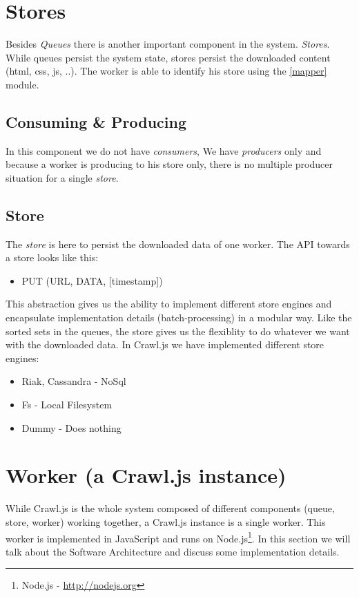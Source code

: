 \section{Stores}
Besides \emph{Queues} there is another important component in the system. \emph{Stores}. While queues persist the system state, stores persist the downloaded content (html, css, js, ..). The worker is able to identify his store using the \ref{mapper} module.
\subsection{Consuming \& Producing}
In this component we do not have \emph{consumers}, We have \emph{producers} only and because a worker is producing to his store only, there is no multiple producer situation for a single \emph{store}.

\subsection{Store}
The \emph{store} is here to persist the downloaded data of one worker. The API towards a store looks like this:
\begin{itemize}
  \item PUT (URL, DATA, [timestamp])
\end{itemize}
This abstraction gives us the ability to implement different store engines and encapsulate implementation details (batch-processing) in a modular way. Like the sorted sets in the queues, the store gives us the flexiblity to do whatever we want with the downloaded data. In Crawl.js we have implemented different store engines:
\begin{itemize}
  \item Riak, Cassandra - NoSql
  \item Fs - Local Filesystem
  \item Dummy - Does nothing
\end{itemize}

\section{Worker (a Crawl.js instance)}
\label{worker}
While Crawl.js is the whole system composed of different components (queue, store, worker) working together, a Crawl.js instance is a single worker. This worker is implemented in JavaScript and runs on Node.js\footnote{Node.js - \url{http://nodejs.org}}.
In this section we will talk about the Software Architecture and discuss some implementation details.

